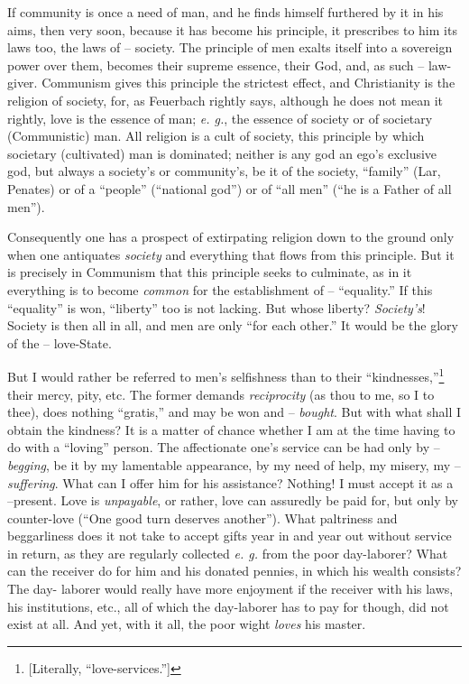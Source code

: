 \documentclass[12pt,a4paper]{book}
\begin{document}
If community is once a need of man, and he finds himself furthered by it in 
his aims, then very soon, because it has become his principle, it prescribes 
to him its laws too, the laws of -- society. The principle of men exalts 
itself into a sovereign power over them, becomes their supreme essence, their 
God, and, as such -- law-giver. Communism gives this principle the strictest 
effect, and Christianity is the religion of society, for, as Feuerbach rightly 
says, although he does not mean it rightly, love is the essence of man; 
\textit{e. g.}, the essence of society or of societary (Communistic) man. All 
religion is a cult of society, this principle by which societary (cultivated) 
man is dominated; neither is any god an ego's exclusive god, but always a 
society's or community's, be it of the society, ``family'' (Lar, Penates) or 
of a ``people'' (``national god'') or of ``all men'' (``he is a Father 
of all men'').

Consequently one has a prospect of extirpating religion down to the ground 
only when one antiquates \textit{society} and everything that flows from this 
principle. But it is precisely in Communism that this principle seeks to 
culminate, as in it everything is to become \textit{common} for the 
establishment of -- ``equality.'' If this ``equality'' is won, 
``liberty'' too is not lacking. But whose liberty? \textit{Society's}! 
Society is then all in all, and men are only ``for each other.'' It would be 
the glory of the -- love-State.

But I would rather be referred to men's selfishness than to their 
``kindnesses,''\footnote{[Literally, ``love-services.'']} their mercy, 
pity, etc. The former demands \textit{reciprocity} (as thou to me, so I to 
thee), does nothing ``gratis,'' and may be won and -- \textit{bought}. But 
with what shall I obtain the kindness? It is a matter of chance whether I am 
at the time having to do with a ``loving'' person. The affectionate one's 
service can be had only by -- \textit{begging}, be it by my lamentable 
appearance, by my need of help, my misery, my -- \textit{suffering}. What can 
I offer him for his assistance? Nothing! I must accept it as a --present. Love 
is \textit{unpayable}, or rather, love can assuredly be paid for, but only by 
counter-love (``One good turn deserves another''). What paltriness and 
beggarliness does it not take to accept gifts year in and year out without 
service in return, as they are regularly collected \textit{e. g.} from the 
poor day-laborer? What can the receiver do for him and his donated pennies, in 
which his wealth consists? The day- laborer would really have more enjoyment 
if the receiver with his laws, his institutions, etc., all of which the 
day-laborer has to pay for though, did not exist at all. And yet, with it all, 
the poor wight \textit{loves} his master.
\end{document}
